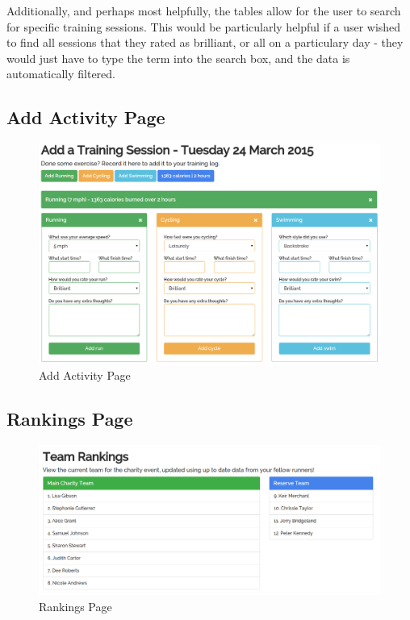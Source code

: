 \documentclass{article}[12pt,a4paper]
\begin{document}
Additionally, and perhaps most helpfully, the tables allow for the user to search for specific training sessions. This would be particularly helpful if a user wished to find all sessions that they rated as brilliant, or all on a particulary day - they would just have to type the term into the search box, and the data is automatically filtered.

\clearpage

\subsection{Add Activity Page}

\begin{figure}[h!]
  \includegraphics[scale=0.35]{final_ui/add_activity}
  \caption{Add Activity Page}
\end{figure}

\clearpage

\subsection{Rankings Page}

\begin{figure}[h!]
  \includegraphics[scale=0.35]{final_ui/rankings}
  \caption{Rankings Page}
\end{figure}
\end{document}

